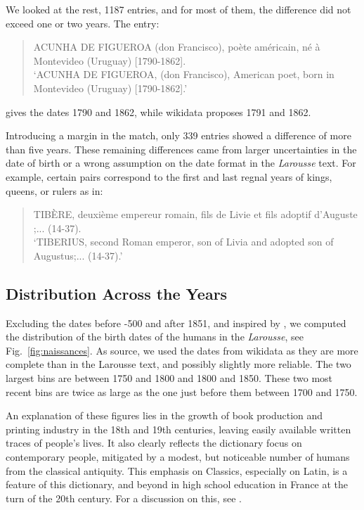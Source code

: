 \documentclass[10pt, a4paper]{article}
\begin{document}
We looked at the rest, 1187 entries, and for most of them, the difference did not exceed one or two years. The entry:
\begin{quote}
ACUNHA DE FIGUEROA (don Francisco), poète américain, né à Montevideo (Uruguay) [1790-1862].\\
`ACUNHA DE FIGUEROA, (don Francisco), American poet, born in Montevideo (Uruguay) [1790-1862].'
\end{quote}
gives the dates 1790 and 1862, while wikidata proposes 1791 and 1862.

Introducing a margin in the match, only 339 entries showed a difference of more than five years. These remaining differences came from larger uncertainties in the date of birth or a wrong assumption on the date format in the \textit{Larousse} text. For example, certain pairs correspond to the first and last regnal years of kings, queens, or rulers as in:
\begin{quote}
TIBÈRE, deuxième empereur romain, fils de Livie et fils adoptif d'Auguste ;... (14-37).\\
`TIBERIUS, second Roman emperor, son of Livia and adopted son of Augustus;... (14-37).'
\end{quote}

\subsection{Distribution Across the Years}
Excluding the dates before -500 and after 1851, and inspired by , we computed the distribution of the birth dates of the humans in the \textit{Larousse}, see Fig.~\ref{fig:naissances}. As source, we used the dates from wikidata as they are more complete than in the Larousse text, and possibly slightly more reliable. The two largest bins are between 1750 and 1800 and 1800 and 1850. These two most recent bins are twice as large as the one just before them between 1700 and 1750. 

An explanation of these figures lies in the growth of book production and printing industry in the 18th and 19th centuries, leaving easily available written traces of people's lives. It also clearly reflects the dictionary focus on contemporary people, mitigated by a modest, but noticeable number of humans from the classical antiquity. This emphasis on Classics, especially on Latin, is a feature of this dictionary, and beyond in high school education in France at the turn of the 20th century. For a discussion on this, see .
\end{document}
